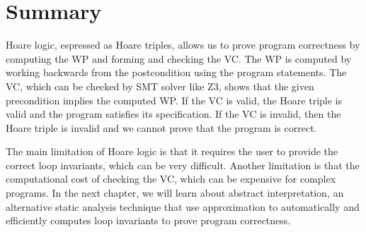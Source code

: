 \documentclass[oneside,11pt,dvipsnames]{book}
\begin{document}







\section{Summary}
Hoare logic, espressed as Hoare triples, allows us to prove program correctness by computing the WP  and forming and checking the VC.  The WP is computed by working backwards from the postcondition using the program statements.  The VC, which can be checked by SMT solver like Z3, shows that the given precondition implies the computed WP.  If the VC is valid, the Hoare triple is valid and the program satisfies its specification.  If the VC is invalid, then the Hoare triple is invalid and we cannot prove that the program is correct.  

The main limitation of Hoare logic is that it requires the user to provide the correct loop invariants, which can be very difficult. Another limitation is that the computational cost of checking the VC, which can be expensive for complex programs.  In the next chapter, we will learn about abstract interpretation, an alternative static analysis technique that use approximation to automatically and efficiently computes loop invariants to prove program correctness.
\end{document}
